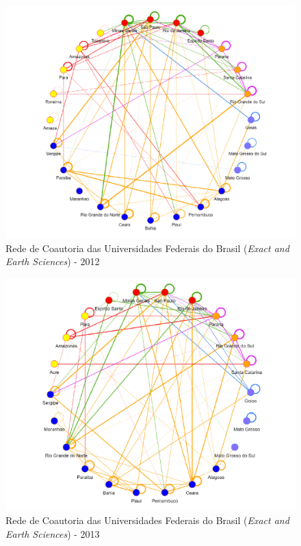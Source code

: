 \begin{figure}[H]
	\centering
	\includegraphics[scale=0.6]{Imagens/rede-exact-br-2012.pdf}
	\caption{Rede de Coautoria das Universidades Federais do Brasil (\textit{Exact and Earth Sciences}) - 2012}
	\label{Rede de Coautoria - UF EXACT BR 2012}
\end{figure}

\begin{figure}[H]
	\centering
	\includegraphics[scale=0.6]{Imagens/rede-exact-br-2013.pdf}
	\caption{Rede de Coautoria das Universidades Federais do Brasil (\textit{Exact and Earth Sciences}) - 2013}
	\label{Rede de Coautoria - UF EXACT BR 2013}
\end{figure}

